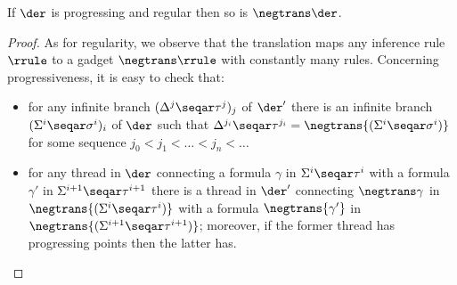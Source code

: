 \begin{proposition}\label{prop:translation-preserves-progressiveness}
        If $\der$ is progressing and regular then so is $\negtrans \der$.
\end{proposition}
\begin{proof}
    As for regularity, we observe that the translation maps any inference rule $\rrule$ to a gadget $\negtrans \rrule$ with constantly many rules. Concerning progressiveness, it is easy to check that:
    \begin{itemize}
        \item  for any infinite branch $(\Delta^j \seqar \tau^j)_j$ of $\der'$ there is an infinite branch $(\Sigma^i \seqar \sigma^i)_i$ of $\der$ such that $\Delta^{j_i} \seqar \tau^{j_i}= \negtrans{(\Sigma^i \seqar \sigma^i)}$ for some sequence  $j_0<j_1<\ldots<j_n<\ldots$
        \item  for any thread  in $\der$ connecting a formula $\gamma$ in $\Sigma^i \seqar \tau^i$ with a formula $\gamma'$ in $\Sigma^{i+1} \seqar \tau^{i+1}$ there is a thread  in $\der'$ connecting $\negtrans \gamma$ in $\negtrans{(\Sigma^i \seqar \tau^i)}$ with a formula $\negtrans{\gamma'}$ in $\negtrans{(\Sigma^{i+1} \seqar \tau^{i+1})}$; moreover, if the former thread has progressing points then the latter has. \qedhere
    \end{itemize}
\end{proof}


